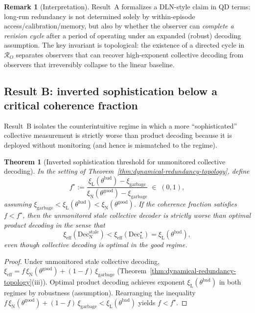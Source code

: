 \documentclass[11pt]{article}
\newcommand{\cR}{\mathcal{R}}
\newcommand{\1}{\mathbf{1}}
\newcommand{\QCBdist}{\xi}
\theoremstyle{definition}
\newtheorem{remark}{Remark}
\theoremstyle{plain}
\newtheorem{theorem}{Theorem}
\begin{document}
\begin{remark}[Interpretation]
Result~A formalizes a DLN-style claim in QD terms: long-run redundancy is not determined solely by within-episode access/calibration/memory, but also by whether the observer can \emph{complete a revision cycle} after a period of operating under an expanded (robust) decoding assumption.
The key invariant is topological: the existence of a directed cycle in $\cR_O$ separates observers that can recover high-exponent collective decoding from observers that irreversibly collapse to the linear baseline.
\end{remark}

\subsection{Result B: inverted sophistication below a critical coherence fraction}

Result~B isolates the counterintuitive regime in which a more ``sophisticated'' collective measurement is strictly worse than product decoding because it is deployed without monitoring (and hence is mismatched to the regime).

\begin{theorem}[Inverted sophistication threshold for unmonitored collective decoding]
\label{thm:inverted-sophistication}
In the setting of Theorem~\ref{thm:dynamical-redundancy-topology}, define
\[
f^\star
:=
\frac{\QCBdist_{\mathrm{L}}(\theta^{\mathrm{bad}})-\QCBdist_{\mathrm{garbage}}}{\QCBdist_{\mathrm{N}}(\theta^{\mathrm{good}})-\QCBdist_{\mathrm{garbage}}}
\;\in\;(0,1),
\]
assuming $\QCBdist_{\mathrm{garbage}}<\QCBdist_{\mathrm{L}}(\theta^{\mathrm{bad}})<\QCBdist_{\mathrm{N}}(\theta^{\mathrm{good}})$.
If the coherence fraction satisfies $f<f^\star$, then the unmonitored stale collective decoder is strictly worse than optimal product decoding in the sense that
\[
\QCBdist_{\mathrm{eff}}(\mathrm{Dec}_{\mathrm{N}}^{\mathrm{stale}})
<
\QCBdist_{\mathrm{eff}}(\mathrm{Dec}_{\mathrm{L}}^{\star})
=
\QCBdist_{\mathrm{L}}(\theta^{\mathrm{bad}}),
\]
even though collective decoding is optimal in the good regime.
\end{theorem}

\begin{proof}
Under unmonitored stale collective decoding,
$\QCBdist_{\mathrm{eff}}=f\,\QCBdist_{\mathrm{N}}(\theta^{\mathrm{good}})+(1-f)\,\QCBdist_{\mathrm{garbage}}$ (Theorem~\ref{thm:dynamical-redundancy-topology}(iii)).
Optimal product decoding achieves exponent $\QCBdist_{\mathrm{L}}(\theta^{\mathrm{bad}})$ in both regimes by robustness (assumption).
Rearranging the inequality
$f\,\QCBdist_{\mathrm{N}}(\theta^{\mathrm{good}})+(1-f)\,\QCBdist_{\mathrm{garbage}} < \QCBdist_{\mathrm{L}}(\theta^{\mathrm{bad}})$
yields $f<f^\star$.
\end{proof}
\end{document}
